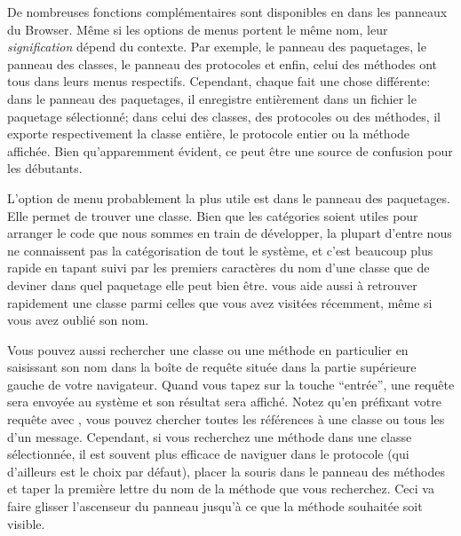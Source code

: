 \documentclass[a4paper,10pt,twoside]{book}
\begin{document}
De nombreuses fonctions complémentaires sont disponibles 
en \actclickant{} dans les panneaux du Browser.
Même si les options de menus portent le même nom,
leur \emph{signification} dépend du contexte.
Par exemple, le panneau des paquetages, le
panneau des classes, le panneau des protocoles et enfin, celui des méthodes
ont tous  dans leurs menus respectifs. Cependant, chaque 
 fait une chose différente: dans le panneau des paquetages,
il enregistre entièrement dans un fichier le paquetage
sélectionné; dans celui des classes, des protocoles ou des
méthodes, il exporte respectivement la classe entière, le protocole
entier ou la méthode affichée. %
Bien qu'apparemment évident, ce peut être une source de confusion pour
les débutants.

L'option de menu probablement la plus utile est  
dans le panneau des paquetages. 
Elle permet de trouver une classe.
Bien que les catégories soient utiles pour arranger le code que nous 
sommes en train de développer, la plupart d'entre nous ne connaissent pas
la catégorisation de tout le système, et c'est beaucoup plus rapide
en tapant  suivi par les premiers caractères du nom d'une 
classe que de deviner dans quel paquetage elle peut bien être.
 vous aide aussi à retrouver rapidement
une classe parmi celles que vous avez visitées récemment, même si vous
avez oublié son nom.

Vous pouvez aussi rechercher une classe ou une méthode en particulier en
saisissant son nom dans la boîte de requête située dans la partie 
supérieure gauche de votre navigateur. Quand vous tapez
sur la touche ``entrée'', une requête sera envoyée au système et son
résultat sera affiché. %
Notez qu'en préfixant votre requête avec \ct{#}, vous pouvez chercher
toutes les références à une classe ou tous les \senders d'un
message.
Cependant, si vous recherchez une méthode dans une classe sélectionnée, il est
souvent plus efficace de naviguer dans le protocole  
(qui d'ailleurs est le choix par défaut), placer la souris dans le
panneau des méthodes et taper la première lettre du nom de la méthode
que vous recherchez. %
Ceci va faire glisser l'ascenseur du panneau jusqu'à ce que la méthode souhaitée soit visible.
\end{document}
